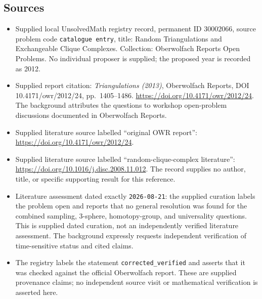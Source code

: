 \documentclass[11pt]{article}
\begin{document}
\subsection{Sources}
\begin{itemize}
\item Supplied local UnsolvedMath registry record, permanent ID \(30002066\), source problem code \texttt{catalogue entry}, title: Random Triangulations and Exchangeable Clique Complexes. Collection: Oberwolfach Reports Open Problems. No individual proposer is supplied; the proposed year is recorded as 2012.
\item Supplied report citation: \emph{Triangulations (2013)}, Oberwolfach Reports, DOI 10.4171/owr/2012/24, pp.\ 1405--1486. \url{https://doi.org/10.4171/owr/2012/24}. The background attributes the questions to workshop open-problem discussions documented in Oberwolfach Reports.
\item Supplied literature source labelled ``original OWR report'': \url{https://doi.org/10.4171/owr/2012/24}.
\item Supplied literature source labelled ``random-clique-complex literature'': \url{https://doi.org/10.1016/j.disc.2008.11.012}. The record supplies no author, title, or specific supporting result for this reference.
\item Literature assessment dated exactly \texttt{2026-08-21}: the supplied curation labels the problem open and reports that no general resolution was found for the combined sampling, \(3\)-sphere, homotopy-group, and universality questions. This is supplied dated curation, not an independently verified literature assessment. The background expressly requests independent verification of time-sensitive status and cited claims.
\item The registry labels the statement \texttt{corrected\_verified} and asserts that it was checked against the official Oberwolfach report. These are supplied provenance claims; no independent source visit or mathematical verification is asserted here.
\end{itemize}
\end{document}

